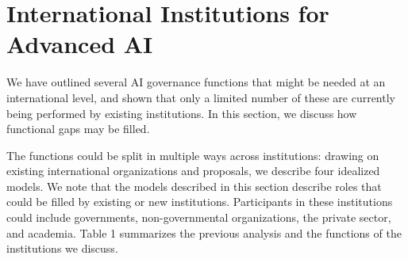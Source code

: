\documentclass[12pt]{article}
\begin{document}
\section{International Institutions for Advanced
AI}

We have outlined several AI governance functions that might be needed at
an international level, and shown that only a limited number of these
are currently being performed by existing institutions. In this section,
we discuss how functional gaps may be filled.

The functions could be split in multiple ways across institutions:
drawing on existing international organizations and proposals, we
describe four idealized models. We note that the models described in
this section describe roles that could be filled by existing or new
institutions. Participants in these institutions could include
governments, non-governmental organizations, the private sector, and
academia. Table 1 summarizes the previous analysis and the functions of
the institutions we discuss.
\end{document}
